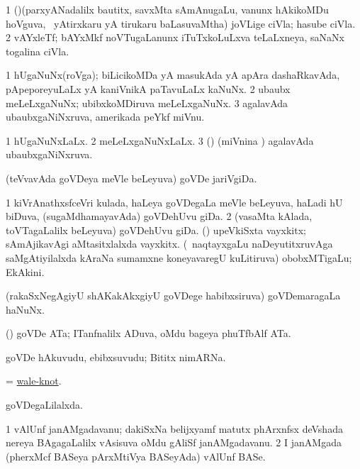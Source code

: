 \bentry
{} 
\gl{\nA}
\bmng
\bnum
\num{1} (\pArxparx)(parxyANadalilx bautitx, savxMta sAmAnugaLu, \mo vanunx hAkikoMDu hoVguva, \kanmu\ yAtirxkaru yA tirukaru baLasuvaMtha) joVLige ciVla; hasube ciVla. 
\num{2} vAYxleTf; bAYxMkf noVTugaLanunx iTuTxkoLuLxva teLaLxneya, saNaNx togalina ciVla. 
\enum
\emng
\eentry

\bentry
{} 
\gl{\nA}
\bmng
\bnum
\num{1} hUgaNuNx(roVga); biLicikoMDa yA masukAda yA apAra dashaRkavAda, pApeporeyuLaLx yA kaniVnikA paTavuLaLx kaNuNx. 
\num{2} ubaubx meLeLxgaNuNx; ubibxkoMDiruva meLeLxgaNuNx.
\num{3} agalavAda ubaubxgaNiNxruva, amerikada peYkf miVnu. 
\enum
\emng
\eentry

\bentry
{} 
\gl{\gu}
\expl{}
\bmng
\bnum
\num{1} hUgaNuNxLaLx. 
\num{2} meLeLxgaNuNxLaLx. 
\num{3} (\ame) (miVnina \vi) agalavAda ubaubxgaNiNxruva. 
\enum
\emng
\eentry

\bentry
{} 
\gl{\nA}
\expl{}
\bmng
(teVvavAda goVDeya meVle beLeyuva) goVDe jariVgiDa. 
\emng
\eentry

\bentry
{} 
\gl{\nA}
\expl{}
\bmng
\bnum
\num{1} kiVrAnathxsfceVri kulada, haLeya goVDegaLa meVle beLeyuva, haLadi hU biDuva, (sugaMdhamayavAda) goVDehUvu giDa. 
\num{2} (vasaMta kAlada, toVTagaLalilx beLeyuva) goVDehUvu giDa. 
 (\AmA) 
\banum
{} upeVkiSxta vayxkitx; sAmAjikavAgi aMtasitxlalxda vayxkitx. 
 (\kanmu\ naqtayxgaLu naDeyutitxruvAga saMgAtiyilalxda kAraNa sumamxne koneyavaregU kuLitiruva) obobxMTigaLu; EkAkini. 
\eanum
\numie
\enum
\emng
\eentry

\bentry
{} 
\gl{\nA}
\expl{}
\bmng
(rakaSxNegAgiyU shAKakAkxgiyU goVDege habibxsiruva) goVDemaragaLa haNuNx. 
\emng
\eentry

\bentry
{} 
\gl{\nA}
\expl{}
\bmng
(\birx) goVDe ATa; ITanfnalilx ADuva, oMdu bageya phuTfbAlf ATa. 
\emng
\eentry

\bentry
{} 
\gl{\nA}
\bmng
goVDe hAkuvudu, ebibxsuvudu; Bititx nimARNa. 
\emng
\eentry

\bentry
{} 
\gl{\nA}
\expl{}
\bmng
= \hyperlink{wale-knot}{wale-knot}. 
\emng
\eentry

\bentry
{} 
\gl{\gu}
\expl{}
\bmng
goVDegaLilalxda. 
\emng
\eentry

\bentry
{}  
\gl{\nA}
\expl{}
\bmng
\bnum
\num{1} vAlUnf janAMgadavanu; dakiSxNa belijxyamf matutx phArxnfsx deVshada nereya BAgagaLalilx vAsisuva oMdu gAliSf janAMgadavanu. 
\num{2} I janAMgada (pherxMcf BASeya pArxMtiVya BASeyAda) vAlUnf BASe. 
\enum
\emng
\eentry

